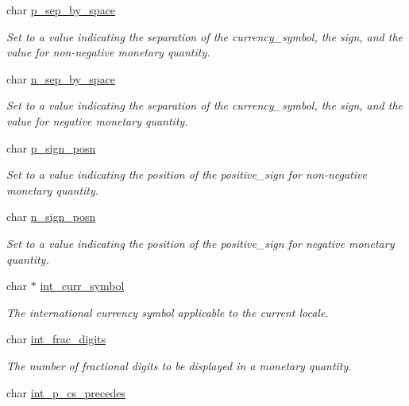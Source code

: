 \begin{DoxyCompactItemize}
char \mbox{\hyperlink{structlconv_a3ae3cb36f4426158e4ab2ea6dc4278ad}{p\+\_\+sep\+\_\+by\+\_\+space}}
\begin{DoxyCompactList}\small\item\em Set to a value indicating the separation of the currency\+\_\+symbol, the sign, and the value for non-\/negative monetary quantity. \end{DoxyCompactList}\item 
char \mbox{\hyperlink{structlconv_ab7ac20ce034900155183b32fc3c6d9a3}{n\+\_\+sep\+\_\+by\+\_\+space}}
\begin{DoxyCompactList}\small\item\em Set to a value indicating the separation of the currency\+\_\+symbol, the sign, and the value for negative monetary quantity. \end{DoxyCompactList}\item 
char \mbox{\hyperlink{structlconv_a1fdead36abe5c2ca673142ea401478e8}{p\+\_\+sign\+\_\+posn}}
\begin{DoxyCompactList}\small\item\em Set to a value indicating the position of the positive\+\_\+sign for non-\/negative monetary quantity. \end{DoxyCompactList}\item 
char \mbox{\hyperlink{structlconv_ae0bbe6f545952daef5a8cbdd054a184e}{n\+\_\+sign\+\_\+posn}}
\begin{DoxyCompactList}\small\item\em Set to a value indicating the position of the positive\+\_\+sign for negative monetary quantity. \end{DoxyCompactList}\item 
char $\ast$ \mbox{\hyperlink{structlconv_abaeeafb02b68ba58c549458b196b9325}{int\+\_\+curr\+\_\+symbol}}
\begin{DoxyCompactList}\small\item\em The international currency symbol applicable to the current locale. \end{DoxyCompactList}\item 
char \mbox{\hyperlink{structlconv_a6b652f28cafc3092258b47c8099fe905}{int\+\_\+frac\+\_\+digits}}
\begin{DoxyCompactList}\small\item\em The number of fractional digits to be displayed in a monetary quantity. \end{DoxyCompactList}\item 
char \mbox{\hyperlink{structlconv_a1a78cbc82f07601c2acb643f8dffdf64}{int\+\_\+p\+\_\+cs\+\_\+precedes}}

\end{DoxyCompactItemize}
